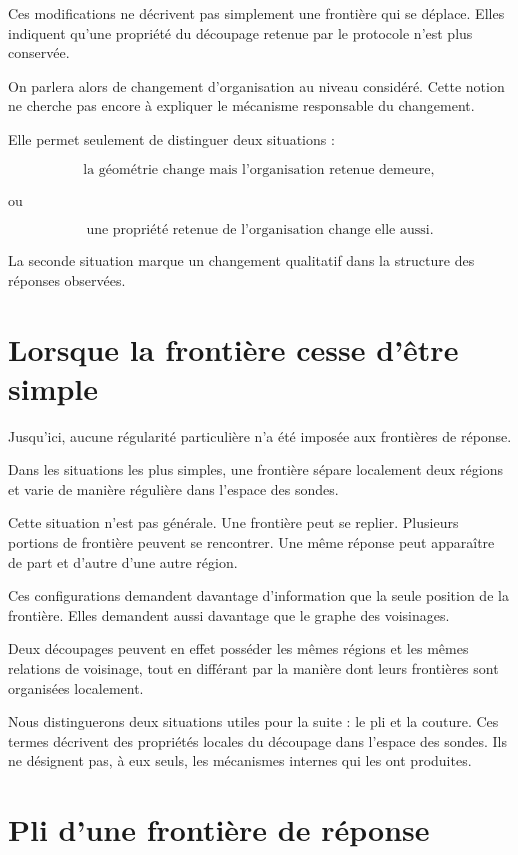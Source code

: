 Ces modifications ne décrivent pas simplement une frontière qui se déplace. Elles indiquent qu'une propriété du découpage retenue par le protocole n'est plus conservée.

On parlera alors de changement d'organisation au niveau considéré. Cette notion ne cherche pas encore à expliquer le mécanisme responsable du changement.

Elle permet seulement de distinguer deux situations :

\[
\text{la géométrie change mais l'organisation retenue demeure},
\]

ou

\[
\text{une propriété retenue de l'organisation change elle aussi}.
\]

La seconde situation marque un changement qualitatif dans la structure des réponses observées.

\section{Lorsque la frontière cesse d'être simple}
\label{t3-frontiere-cesse-etre-simple}

Jusqu'ici, aucune régularité particulière n'a été imposée aux frontières
de réponse.

Dans les situations les plus simples, une frontière sépare localement
deux régions et varie de manière régulière dans l'espace des sondes.

Cette situation n'est pas générale. Une frontière peut se replier. Plusieurs portions de frontière peuvent se rencontrer. Une même réponse peut apparaître de part et d'autre d'une autre région.

Ces configurations demandent davantage d'information que la seule
position de la frontière. Elles demandent aussi davantage que le graphe des voisinages.

Deux découpages peuvent en effet posséder les mêmes régions et les mêmes relations de voisinage, tout en différant par la manière dont leurs frontières sont organisées localement.

Nous distinguerons deux situations utiles pour la suite : le pli et la couture. Ces termes décrivent des propriétés locales du découpage dans l'espace des sondes. Ils ne désignent pas, à eux seuls, les mécanismes internes qui les ont produites.

\section{Pli d'une frontière de réponse}
\label{t3-pli-frontiere-reponse}

